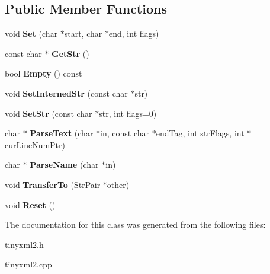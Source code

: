\subsection*{Public Member Functions}
\begin{DoxyCompactItemize}
\item 
\mbox{\label{classtinyxml2_1_1_str_pair_a4f05549373394266a1eecba26813c166}} 
void {\bfseries Set} (char $\ast$start, char $\ast$end, int flags)
\item 
\mbox{\label{classtinyxml2_1_1_str_pair_ad87e3d11330f5e689ba1e7e54c023b57}} 
const char $\ast$ {\bfseries Get\+Str} ()
\item 
\mbox{\label{classtinyxml2_1_1_str_pair_aca963a7eaa900bfddbea7312f040b39c}} 
bool {\bfseries Empty} () const
\item 
\mbox{\label{classtinyxml2_1_1_str_pair_a2baf6230e18333e02ab65d0897ee3941}} 
void {\bfseries Set\+Interned\+Str} (const char $\ast$str)
\item 
\mbox{\label{classtinyxml2_1_1_str_pair_a1f82ec6b5bee35ee7466d8565e43b1de}} 
void {\bfseries Set\+Str} (const char $\ast$str, int flags=0)
\item 
\mbox{\label{classtinyxml2_1_1_str_pair_a68e6999b7677fa711287ececb9ba317e}} 
char $\ast$ {\bfseries Parse\+Text} (char $\ast$in, const char $\ast$end\+Tag, int str\+Flags, int $\ast$cur\+Line\+Num\+Ptr)
\item 
\mbox{\label{classtinyxml2_1_1_str_pair_aa6d8998efceba41d87ec2300c70a6085}} 
char $\ast$ {\bfseries Parse\+Name} (char $\ast$in)
\item 
\mbox{\label{classtinyxml2_1_1_str_pair_a35f795b1557fe5fdcbd93d3cc5d6b939}} 
void {\bfseries Transfer\+To} (\mbox{\hyperlink{classtinyxml2_1_1_str_pair}{Str\+Pair}} $\ast$other)
\item 
\mbox{\label{classtinyxml2_1_1_str_pair_a80c1b3bd99bf62ae85c94a29ce537125}} 
void {\bfseries Reset} ()
\end{DoxyCompactItemize}


The documentation for this class was generated from the following files\+:\begin{DoxyCompactItemize}
\item 
tinyxml2.\+h\item 
tinyxml2.\+cpp\end{DoxyCompactItemize}
